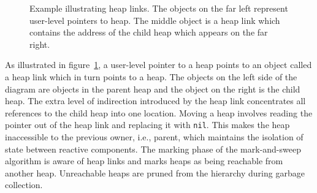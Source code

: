 \begin{figure}
\centering
\caption{Example illustrating heap links\label{heap_link}.  The objects on the far left represent user-level pointers to heap.  The middle object is a heap link which contains the address of the child heap which appears on the far right.}
\end{figure}

As illustrated in figure~\ref{heap_link}, a user-level pointer to a heap points to an object called a heap link which in turn points to a heap.
The objects on the left side of the diagram are objects in the parent heap and the object on the right is the child heap.
The extra level of indirection introduced by the heap link concentrates all references to the child heap into one location.
Moving a heap involves reading the pointer out of the heap link and replacing it with \verb+nil+.
This makes the heap inaccessible to the previous owner, i.e., parent, which maintains the isolation of state between reactive components.
The marking phase of the mark-and-sweep algorithm is aware of heap links and marks heaps as being reachable from another heap.
Unreachable heaps are pruned from the hierarchy during garbage collection.

